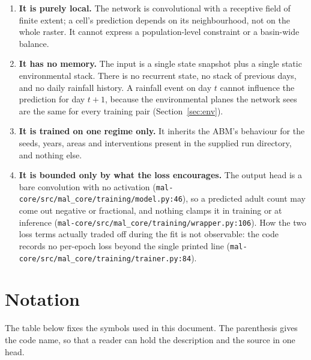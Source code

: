 \documentclass[11pt,a4paper]{article}
\newcommand{\codex}[1]{\texttt{#1}}
\begin{document}
\begin{enumerate}
\item \textbf{It is purely local.} The network is convolutional with a
      receptive field of finite extent; a cell's prediction depends on its
      neighbourhood, not on the whole raster. It cannot express a
      population-level constraint or a basin-wide balance.
\item \textbf{It has no memory.} The input is a single state snapshot plus a
      single static environmental stack. There is no recurrent state, no
      stack of previous days, and no daily rainfall history. A rainfall event
      on day \(t\) cannot influence the prediction for day \(t+1\), because
      the environmental planes the network sees are the same for every
      training pair (Section~\ref{sec:env}).
\item \textbf{It is trained on one regime only.} It inherits the ABM's
      behaviour for the seeds, years, areas and interventions present in the
      supplied run directory, and nothing else.
\item \textbf{It is bounded only by what the loss encourages.} The output
      head is a bare convolution with no activation
      (\codex{mal-core/\allowbreak{}src/\allowbreak{}mal\_\allowbreak{}core/\allowbreak{}training/\allowbreak{}model.py:46}), so a predicted
      adult count may come out negative or fractional, and nothing clamps it
      in training or at inference
      (\codex{mal-core/\allowbreak{}src/\allowbreak{}mal\_\allowbreak{}core/\allowbreak{}training/\allowbreak{}wrapper.py:106}). How the two
      loss terms actually traded off during the fit is not observable: the
      code records no per-epoch loss beyond the single printed line
      (\codex{mal-core/\allowbreak{}src/\allowbreak{}mal\_\allowbreak{}core/\allowbreak{}training/\allowbreak{}trainer.py:84}).
\end{enumerate}

\section{Notation}

The table below fixes the symbols used in this document. The parenthesis gives
the code name, so that a reader can hold the description and the source in one
head.
\end{document}
